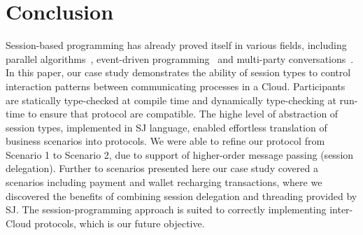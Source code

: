 \documentclass[10pt]{llncs}
\begin{document}
\section{Conclusion}
\label{sect:conclusion}
Session-based programming has already proved itself in various fields, including parallel algorithms~\cite{sj-parallel}, event-driven programming~\cite{event-driven-sj} and multi-party conversations~\cite{sj-business-protocols}.
In this paper, our case study demonstrates the ability of session types to control interaction patterns between communicating processes in a Cloud.
Participants are statically type-checked at compile time and dynamically type-checking at run-time to ensure that protocol are compatible.
The highe level of abstraction of session types, implemented in SJ language, enabled effortless translation of business scenarios into protocols.
We were able to refine our protocol from Scenario 1 to Scenario 2, due to support of higher-order message passing (session delegation). %
Further to scenarios presented here our case study covered a scenarios including payment and wallet recharging transactions, %
where we discovered the benefits of combining session delegation and threading provided by SJ.
The session-programming approach is suited to correctly implementing inter-Cloud protocols, which is our future objective. %


%
\label{sect:bib}

%
%
%


\appendix




\end{document}
